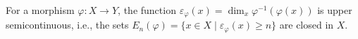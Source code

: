 For a morphism $\varphi: X \rightarrow Y$, the function $\varepsilon_\varphi(x) = \dim_x \varphi^{-1}(\varphi(x))$ is upper semicontinuous, i.e., the sets $E_n(\varphi) = \{x \in X \mid \varepsilon_\varphi(x) \geq n\}$ are closed in $X$.
